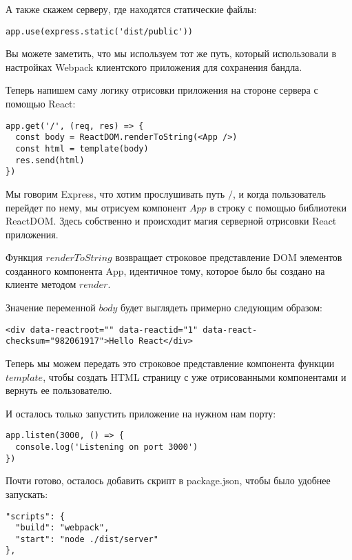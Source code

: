 А также скажем серверу, где находятся статические файлы:

\begin{lstlisting}
app.use(express.static('dist/public'))
\end{lstlisting}

Вы можете заметить, что мы используем тот же путь, который использовали в настройках Webpack клиентского приложения для сохранения бандла. 

Теперь напишем саму логику отрисовки приложения на стороне сервера с помощью React:


\begin{lstlisting}
app.get('/', (req, res) => {
  const body = ReactDOM.renderToString(<App />)
  const html = template(body)
  res.send(html)
})
\end{lstlisting}

Мы говорим Express, что хотим прослушивать путь $/$, и когда пользователь перейдет по нему, мы отрисуем компонент $App$ в строку с помощью библиотеки ReactDOM. Здесь собственно и происходит магия серверной отрисовки React приложения.

Функция $renderToString$ возвращает строковое представление DOM элементов созданного компонента App, идентичное тому, которое было бы создано на клиенте методом $render$.

Значение переменной $body$ будет выглядеть примерно следующим образом:

\begin{lstlisting}
<div data-reactroot="" data-reactid="1" data-react-checksum="982061917">Hello React</div>
\end{lstlisting}

Теперь мы можем передать это строковое представление компонента функции $template$, чтобы создать HTML страницу с уже отрисованными компонентами и вернуть ее пользователю.

И осталось только запустить приложение на нужном нам порту:

\begin{lstlisting}
app.listen(3000, () => {
  console.log('Listening on port 3000')
})
\end{lstlisting}

Почти готово, осталось добавить скрипт в package.json, чтобы было удобнее запускать:

\begin{lstlisting}
"scripts": {
  "build": "webpack",
  "start": "node ./dist/server"
},
\end{lstlisting}

